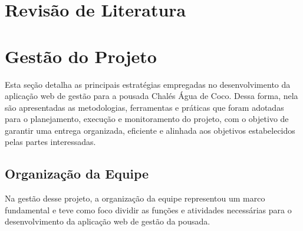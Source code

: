 \documentclass[
	12pt,				%
	openany,			%
	twoside,			%
	a4paper,			%
	english,			%
	french,				%
	spanish,			%
	brazil				%
	]{abntex2}
\begin{document}


\chapter{Revisão de Literatura}

\section{}



\chapter{Gestão do Projeto}
Esta seção detalha as principais estratégias empregadas no desenvolvimento da aplicação web de gestão para a pousada Chalés Água de Coco. Dessa forma, nela são apresentadas as metodologias, ferramentas e práticas que foram adotadas para o planejamento, execução e monitoramento do projeto, com o objetivo de garantir uma entrega organizada, eficiente e alinhada aos objetivos estabelecidos pelas partes interessadas.
\section{Organização da Equipe}
Na gestão desse projeto, a organização da equipe representou um marco fundamental e teve como foco dividir as funções e atividades necessárias para o desenvolvimento da aplicação web de gestão da pousada.
\end{document}
